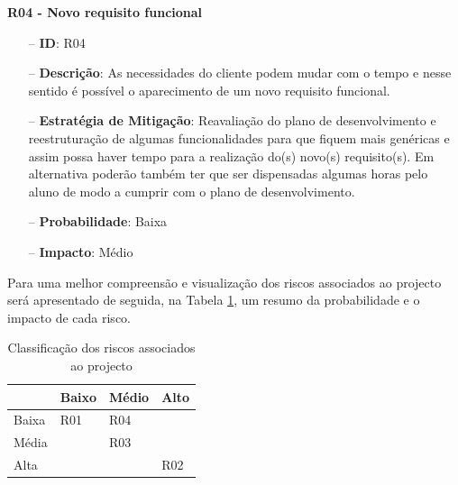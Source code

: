\textbf{R04 - Novo requisito funcional}
\begin{itemize}
	\item[--] \textbf{ID}: R04
	\item[--] \textbf{Descrição}: As necessidades do cliente podem mudar com o tempo e nesse sentido é possível o aparecimento de um novo requisito funcional.
	\item[--] \textbf{Estratégia de Mitigação}: Reavaliação do plano de desenvolvimento e reestruturação de algumas funcionalidades para que fiquem mais genéricas e assim possa haver tempo para a realização do(s) novo(s) requisito(s). Em alternativa poderão também ter que ser dispensadas algumas horas pelo aluno de modo a cumprir com o plano de desenvolvimento.
	\item[--] \textbf{Probabilidade}: Baixa 
	\item[--] \textbf{Impacto}: Médio
\end{itemize}

Para uma melhor compreensão e visualização dos riscos associados ao projecto será apresentado de seguida, na Tabela \ref{tab:riscos}, um resumo da probabilidade e o impacto de cada risco.

\pagebreak
\mbox{}
\begin{table}
	\centering
\begin{tabular}{ | l | l | l | l |}
	\hline
	\diagbox[width=15em]{Impacto}{Probabilidade}
	& Baixo & Médio & Alto\\
	\hline
	Baixa & \cellcolor{green}\centering R01 & \cellcolor{yellow}R04& \cellcolor{orange}\\
	\hline
	Média & \cellcolor{yellow} & \cellcolor{orange}R03 & \cellcolor{darkOrange}\\
	\hline
	Alta & \cellcolor{orange} & \cellcolor{darkOrange} & \cellcolor{red}R02\\
	\hline
\end{tabular}
\begin{center}
\caption {Classificação dos riscos associados ao projecto}
\label {tab:riscos}
\end{center}
\end{table}










\blankpage

\glsresetall
